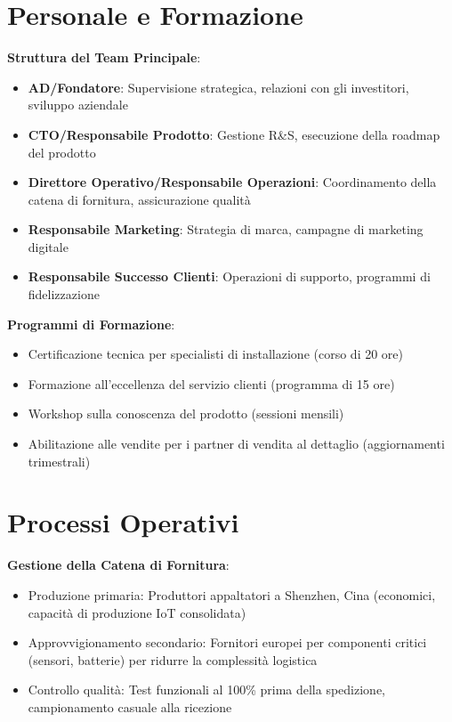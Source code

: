 \documentclass[11pt,a4paper]{report}
\begin{document}
\section{Personale e Formazione}
\textbf{Struttura del Team Principale}:
\begin{itemize}
    \item \textbf{AD/Fondatore}: Supervisione strategica, relazioni con gli investitori, sviluppo aziendale
    \item \textbf{CTO/Responsabile Prodotto}: Gestione R\&S, esecuzione della roadmap del prodotto
    \item \textbf{Direttore Operativo/Responsabile Operazioni}: Coordinamento della catena di fornitura, assicurazione qualità
    \item \textbf{Responsabile Marketing}: Strategia di marca, campagne di marketing digitale
    \item \textbf{Responsabile Successo Clienti}: Operazioni di supporto, programmi di fidelizzazione
\end{itemize}

\textbf{Programmi di Formazione}:
\begin{itemize}
    \item Certificazione tecnica per specialisti di installazione (corso di 20 ore)
    \item Formazione all'eccellenza del servizio clienti (programma di 15 ore)
    \item Workshop sulla conoscenza del prodotto (sessioni mensili)
    \item Abilitazione alle vendite per i partner di vendita al dettaglio (aggiornamenti trimestrali)
\end{itemize}

\section{Processi Operativi}
\textbf{Gestione della Catena di Fornitura}:
\begin{itemize}
    \item Produzione primaria: Produttori appaltatori a Shenzhen, Cina (economici, capacità di produzione IoT consolidata)
    \item Approvvigionamento secondario: Fornitori europei per componenti critici (sensori, batterie) per ridurre la complessità logistica
    \item Controllo qualità: Test funzionali al 100\% prima della spedizione, campionamento casuale alla ricezione
\end{itemize}
\end{document}

